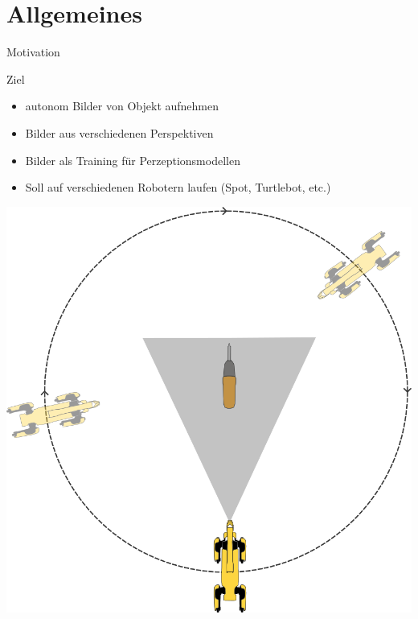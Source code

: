 \documentclass[aspectratio=169]{beamer}
\begin{document}
\section{Allgemeines}
\begin{frame}{Motivation}
	\begin{minipage}{0.55 \textwidth}
		\begin{block}{Ziel}
			\begin{itemize}
				\item autonom Bilder von Objekt aufnehmen
				\item Bilder aus verschiedenen Perspektiven
				\item Bilder als Training für Perzeptionsmodellen
				\item Soll auf verschiedenen Robotern laufen (Spot, Turtlebot, etc.)
			\end{itemize}
		\end{block}
	\end{minipage}
	\hfill
	\begin{minipage}{0.4 \textwidth}
		\centering
		\includegraphics[width=1\textwidth]{Graphics/graphic_top_down.png}
	\end{minipage}
\end{frame}
\end{document}
